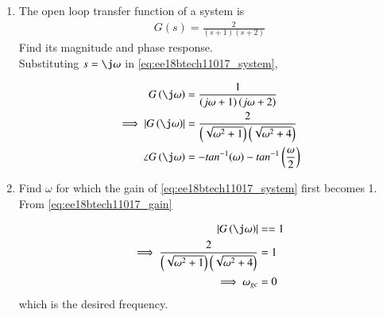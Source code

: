 \begin{enumerate}[label=\thesection.\arabic*.,ref=\thesection.\theenumi]

\item The open loop transfer function of a system is 
\begin{align}
G(s) = \frac{2}{(s+1)(s+2)}
\label{eq:ee18btech11017_system}
\end{align}
Find its magnitude and phase response.
\\
\solution Substituting $s = \j\omega$ in \eqref{eq:ee18btech11017_system},

\begin{align}
G\brak{\j\omega}&=\frac{1}{\brak{j\omega+1}\brak{j\omega+2}} 
\\
\implies 
\abs{G\brak{\j\omega}}&=\frac{2}{\brak{\sqrt{\omega^2+1}}\brak{\sqrt{\omega^2+4}}}
\label{eq:ee18btech11017_gain}
\\
\angle G\brak{\j\omega}&=- tan^{-1}(\omega) - tan^{-1}\brak{\frac{\omega}{2}} 
\label{eq:ee18btech11017_phase}
\end{align}

\item Find $\omega$ for which the gain of \eqref{eq:ee18btech11017_system} first becomes 1.
\\
\solution From \eqref{eq:ee18btech11017_gain}

\begin{align}
\abs{G\brak{\j\omega}}&==1
\\
\implies \frac{2}{\brak{\sqrt{\omega^2+1}}\brak{\sqrt{\omega^2+4}}}&=1
\\
\implies \omega_{gc}&=0
\end{align}
which is the desired frequency.


\end{enumerate}
